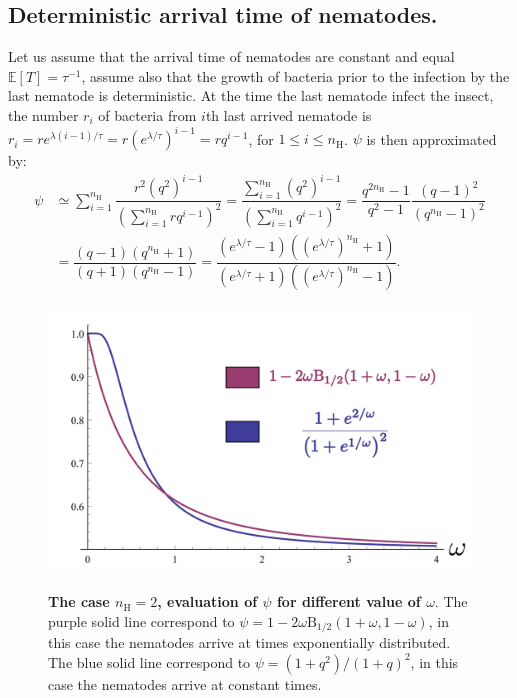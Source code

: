 \documentclass{article}
\newcommand{\nN}{{n_\textrm{H}}}
\begin{document}
  \subsection{Deterministic arrival time of nematodes.}
 Let us assume that the arrival time of nematodes are constant and equal $\mathbb{E}[T]=\tau^{-1}$, assume also that the growth of bacteria prior to the infection by the last nematode is deterministic. At the time the last nematode infect the insect, the number $r_i$ of bacteria from $i$th last arrived nematode is $r_i=r e^{\lambda  (i-1)/ \tau}=r (e^{ \lambda / \tau })^{i-1}=r q^{i-1}$, for $ 1 \leq i \leq \nN$.
 $\psi$ is then approximated by: 
 \begin{align}
  \psi &\simeq \displaystyle \sum_{i=1}^\nN \dfrac{  r^2 (q^2)^{i-1}}{\left(\sum_{i=1}^\nN r q^{i-1}\right)^2} = \dfrac{ \sum_{i=1}^\nN (q^2)^{i-1}}{\left(\sum_{i=1}^\nN q^{i-1}\right)^2}= \dfrac{q^{2\nN} -1 }{q^{2} -1 } \dfrac{(q-1)^2}{(q^\nN -1)^2} \\
  &= \dfrac{(q-1)(q^\nN +1)}{(q+1)(q^\nN -1)} = \dfrac{(e^{  \lambda / \tau}-1)((e^{\lambda / \tau})^\nN +1)}{(e^{\lambda / \tau}+1)((e^{\lambda / \tau})^\nN -1)}. \label{psi}
 \end{align}
\begin{figure}[H]
	  \centering
       \includegraphics[width=13.0cm]{Figures/plot_psiofomega.png}\\
		\caption{ \textbf{The case $\nN =2$, evaluation of $\psi$ for different value of $\omega$}. 
		\label{plot_psiofomega} The purple solid line correspond to $\psi=1- 2 \omega \mathrm{B}_{1/2}(1+\omega,1-\omega)$, in this case the nematodes arrive at times exponentially distributed. The blue solid line correspond to $\psi=(1+q^2)/(1+q)^2$, in this case the nematodes arrive at constant times.
		}
	\end{figure}
\end{document}
